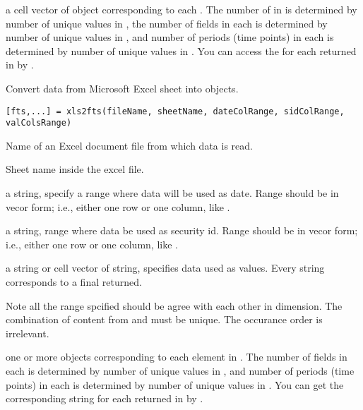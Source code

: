 \outarg
   \begin{argdesc}
   \item[fts] a cell vector of \myfints{} object corresponding to each .
              The number of \myfints{} in  is determined by number of unique values in ,
              the number of fields in each \myfints{} is determined by number of unique values in ,
              and number of periods (time points) in each \myfints{} is determined by number of 
              unique values in .
              You can access the  for each returned \myfints{} in  by
                 .
   \end{argdesc}

 
   Convert data from Microsoft Excel sheet into \myfints{} objects.

\usage
   \begin{lstlisting}[numbers=none]
   [fts,...] = xls2fts(fileName, sheetName, dateColRange, sidColRange, valColsRange)
   \end{lstlisting}

\inarg
   \begin{argdesc}
   \item[fileName]  Name of an Excel document file from which data is read.
   \item[sheetName] Sheet name inside the  excel file.
   \item[dateColRange] a string, specify a range where data will be used as date. 
         Range should be in vecor form; i.e., either one row or one column, like .
   \item[sidColRange] a string, range where data be used as security id.
         Range should be in vecor form; i.e., either one row or one column, like .
   \item[valColsRange] a string or cell vector of string, specifies data used as values.
        Every string corresponds to a final \myfints{} returned.
   \end{argdesc}

   Note all the range spcified should be agree with each other in dimension.
   The combination of content from  and  must be unique.
   The occurance order is irrelevant.
   
\outarg
   \begin{argdesc}
   \item[fts, ...] one or more \myfints{} objects corresponding to each element in .
              The number of fields in each \myfints{} is determined by number of unique values in ,
              and number of periods (time points) in each \myfints{} is determined by number of 
              unique values in .
              You can get the corresponding  string for each returned \myfints{} in  by
                 .
   \end{argdesc}
 

